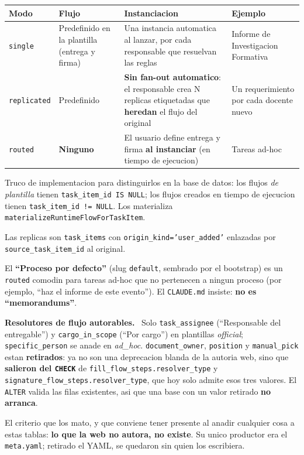 \documentclass[11pt,a4paper,oneside]{report}
\newenvironment{nota}[1][Nota]{%
  \par\medskip
  \colorlet{shadecolor}{black!6}%
  \begin{shaded}\noindent\textbf{#1.}\ \ignorespaces}%
  {\end{shaded}\par\medskip}
\newcommand{\rt}[1]{\texttt{#1}}
\begin{document}
\begin{center}
\footnotesize
\begin{tabularx}{\textwidth}{@{}P{2.2cm}P{3.4cm}LP{3.4cm}@{}}
\toprule
\textbf{Modo} & \textbf{Flujo} & \textbf{Instanciacion} & \textbf{Ejemplo} \\
\midrule
\rt{single} &
  Predefinido en la plantilla (entrega y firma) &
  Una instancia automatica al lanzar, por cada responsable que resuelvan las reglas &
  Informe de Investigacion Formativa \\
\rt{replicated} &
  Predefinido &
  \textbf{Sin fan-out automatico}: el responsable crea N replicas etiquetadas que
  \textbf{heredan} el flujo del original &
  Un requerimiento por cada docente nuevo \\
\rt{routed} &
  \textbf{Ninguno} &
  El usuario define entrega y firma \textbf{al instanciar} (en tiempo de ejecucion) &
  Tareas ad-hoc \\
\bottomrule
\end{tabularx}
\end{center}

Truco de implementacion para distinguirlos en la base de datos: los flujos \emph{de plantilla}
tienen \rt{task\_item\_id IS NULL}; los flujos creados en tiempo de ejecucion tienen
\rt{task\_item\_id != NULL}. Los materializa \rt{materializeRuntimeFlowForTaskItem}.

Las replicas son \rt{task\_items} con \rt{origin\_kind='user\_added'} enlazadas por
\rt{source\_task\_item\_id} al original.

El \textbf{``Proceso por defecto''} (slug \rt{default}, sembrado por el bootstrap) es un
\rt{routed} comodin para tareas ad-hoc que no pertenecen a ningun proceso (por ejemplo, ``haz
el informe de este evento''). El \rt{CLAUDE.md} insiste: \textbf{no es ``memorandums''}.

\begin{nota}[Resolutores de flujo autorables]
Solo \rt{task\_assignee} (``Responsable del entregable'') y \rt{cargo\_in\_scope} (``Por
cargo'') en plantillas \emph{official}; \rt{specific\_person} se anade en \emph{ad\_hoc}.
\rt{document\_owner}, \rt{position} y \rt{manual\_pick} estan \textbf{retirados}: ya no son una
deprecacion blanda de la autoria web, sino que \textbf{salieron del \rt{CHECK}} de
\rt{fill\_flow\_steps.resolver\_type} y \rt{signature\_flow\_steps.resolver\_type}, que hoy solo
admite esos tres valores. El \rt{ALTER} valida las filas existentes, asi que una base con un
valor retirado \textbf{no arranca}.

El criterio que los mato, y que conviene tener presente al anadir cualquier cosa a estas tablas:
\textbf{lo que la web no autora, no existe}. Su unico productor era el \rt{meta.yaml}; retirado
el YAML, se quedaron sin quien los escribiera.
\end{nota}
\end{document}
